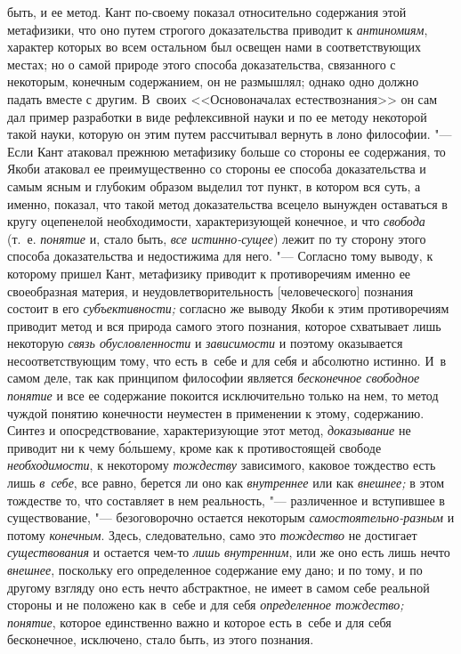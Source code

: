 быть, и ее метод. Кант по-своему показал относительно содержания этой
метафизики, что оно путем строгого доказательства приводит к
{\em антиномиям},
характер которых во всем остальном был освещен нами в
соответствующих местах; но о самой природе этого способа доказательства,
связанного с некоторым, конечным содержанием, он не размышлял; однако одно
должно падать вместе с другим. В~своих <<Основоначалах
естествознания>>
он сам дал пример разработки в виде рефлексивной науки и по
ее методу некоторой такой науки, которую он этим путем рассчитывал вернуть
в лоно философии. "--- Если Кант атаковал прежнюю метафизику
больше со стороны ее содержания, то Якоби атаковал ее преимущественно со
стороны ее способа доказательства и самым ясным и глубоким образом выделил
тот пункт, в котором вся суть, а именно, показал, что такой метод
доказательства всецело вынужден оставаться в кругу оцепенелой
необходимости, характеризующей конечное, и что {\em свобода}
(т.~е. {\em понятие} и, стало быть, {\em все истинно-сущее})
лежит по ту сторону этого способа доказательства и
недостижима для него. "--- Согласно тому выводу, к которому
пришел Кант, метафизику приводит к противоречиям именно ее своеобразная
материя, и неудовлетворительность [человеческого] познания состоит в его
{\em субъективности;} согласно же выводу Якоби к этим противоречиям приводит
метод и вся природа самого этого познания, которое схватывает лишь некоторую
{\em связь обусловленности} и {\em зависимости}
и поэтому оказывается несоответствующим тому, что есть в~себе
и для себя и абсолютно истинно. И~в самом деле, так как принципом философии
является {\em бесконечное свободное
понятие} и все ее содержание покоится исключительно только
на нем, то метод чуждой понятию конечности неуместен в применении к этому,
содержанию. Синтез и опосредствование, характеризующие этот метод,
{\em доказывание} не
приводит ни к чему б\'{о}льшему, кроме как к противостоящей свободе
{\em необходимости}, к
некоторому {\em тождеству}
зависимого, каковое тождество есть лишь
{\em в~себе}, все равно,
берется ли оно как {\em внутреннее}
или как {\em внешнее;}
в этом тождестве то, что составляет в нем реальность, "---
различенное и вступившее в существование, "---
безоговорочно остается некоторым
{\em самостоятельно-разным}
и потому {\em конечным}.
Здесь, следовательно, само это
{\em тождество} не
достигает {\em существования}
и остается чем-то
{\em лишь внутренним},
или же оно есть лишь нечто
{\em внешнее}, поскольку
его определенное содержание ему дано; и по тому, и по другому взгляду оно
есть нечто абстрактное, не имеет в самом себе реальной стороны и не
положено как в~себе и для себя
{\em определенное тождество;}
{\em понятие}, которое
единственно важно и которое есть в~себе и для себя бесконечное, исключено,
стало быть, из этого познания.

